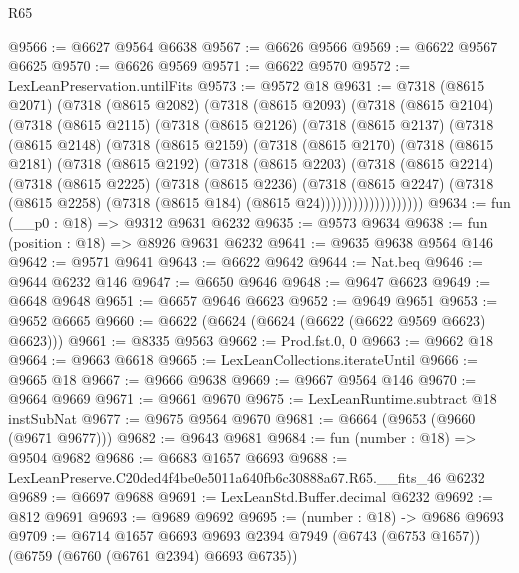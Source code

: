 \begin{lexlean}{R65}
\begin{coremodule}
{@9566 := @6627 @9564 @6638
@9567 := @6626 @9566
@9569 := @6622 @9567 @6625
@9570 := @6626 @9569
@9571 := @6622 @9570
@9572 := LexLeanPreservation.untilFits
@9573 := @9572 @18
@9631 := @7318
    (@8615 @2071)
    (@7318
      (@8615 @2082)
      (@7318
        (@8615 @2093)
        (@7318
          (@8615 @2104)
          (@7318
            (@8615 @2115)
            (@7318
              (@8615 @2126)
              (@7318
                (@8615 @2137)
                (@7318
                  (@8615 @2148)
                  (@7318
                    (@8615 @2159)
                    (@7318
                      (@8615 @2170)
                      (@7318
                        (@8615 @2181)
                        (@7318
                          (@8615 @2192)
                          (@7318
                            (@8615 @2203)
                            (@7318
                              (@8615 @2214)
                              (@7318
                                (@8615 @2225)
                                (@7318
                                  (@8615 @2236)
                                  (@7318
                                    (@8615 @2247)
                                    (@7318
                                      (@8615 @2258)
                                      (@7318 (@8615 @184) (@8615 @24)))))))))))))))))))
@9634 := fun (__p0 : @18) => @9312 @9631 @6232
@9635 := @9573 @9634
@9638 := fun (position : @18) => @8926 @9631 @6232
@9641 := @9635 @9638 @9564 @146
@9642 := @9571 @9641
@9643 := @6622 @9642
@9644 := Nat.beq
@9646 := @9644 @6232 @146
@9647 := @6650 @9646
@9648 := @9647 @6623
@9649 := @6648 @9648
@9651 := @6657 @9646 @6623
@9652 := @9649 @9651
@9653 := @9652 @6665
@9660 := @6622 (@6624 (@6624 (@6622 (@6622 @9569 @6623) @6623)))
@9661 := @8335 @9563
@9662 := Prod.fst.{0, 0}
@9663 := @9662 @18
@9664 := @9663 @6618
@9665 := LexLeanCollections.iterateUntil
@9666 := @9665 @18
@9667 := @9666 @9638
@9669 := @9667 @9564 @146
@9670 := @9664 @9669
@9671 := @9661 @9670
@9675 := LexLeanRuntime.subtract @18 instSubNat
@9677 := @9675 @9564 @9670
@9681 := @6664 (@9653 (@9660 (@9671 @9677)))
@9682 := @9643 @9681
@9684 := fun (number : @18) => @9504 @9682
@9686 := @6683 @1657 @6693
@9688 := LexLeanPreserve.C20ded4f4be0e5011a640fb6c30888a67.R65.__fits_46 @6232
@9689 := @6697 @9688
@9691 := LexLeanStd.Buffer.decimal @6232
@9692 := @812 @9691
@9693 := @9689 @9692
@9695 := (number : @18) -> @9686 @9693
@9709 := @6714
    @1657
    @6693
    @9693
    @2394
    @7949
    (@6743 (@6753 @1657))
    (@6759 (@6760 (@6761 @2394) @6693 @6735))
}
\end{coremodule}
\end{lexlean}
